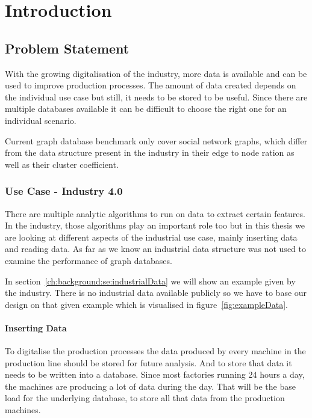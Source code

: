 \chapter{Introduction}
\label{ch:introduction}


\section{Problem Statement}
With the growing digitalisation of the industry,
more data is available and can be used to improve production processes.
The amount of data created depends on the individual use case but still,
it needs to be stored to be useful.
Since there are multiple databases available it can be difficult to choose the right one for an individual scenario.

Current graph database benchmark only cover social network graphs,
which differ from the data structure present in the industry in their edge to node ration as well as their cluster coefficient.

\subsection{Use Case - Industry 4.0}
There are multiple analytic algorithms to run on data to extract certain features.
In the industry,
those algorithms play an important role too but in this thesis we are looking at different aspects of the industrial use case,
mainly inserting data and reading data.
As far as we know an industrial data structure was not used to examine the performance of graph databases.

In section~\ref{ch:background:se:industrialData} we will show an example given by the industry.
There is no industrial data available publicly so we have to base our design on that given example which is visualised in figure~\ref{fig:exampleData}.

\subsubsection{Inserting Data}
To digitalise the production processes the data produced by every machine in the production line should be stored for future analysis.
And to store that data it needs to be written into a database.
Since most factories running 24 hours a day,
the machines are producing a lot of data during the day.
That will be the base load for the underlying database, to store all that data from the production machines.

